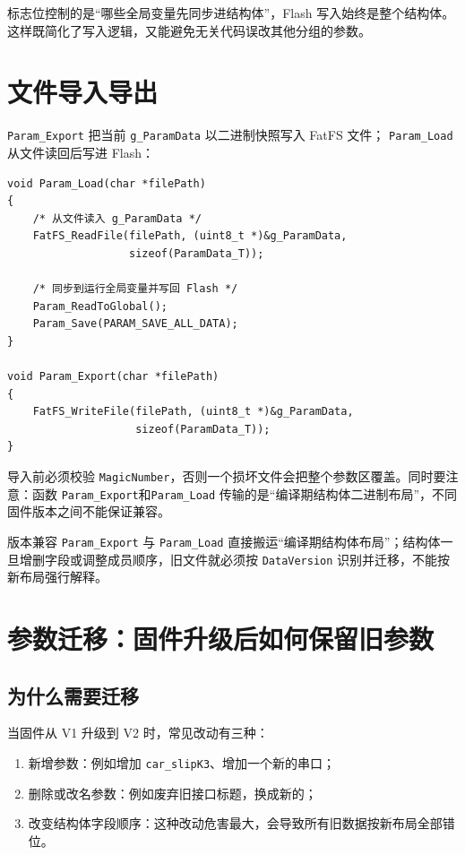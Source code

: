 标志位控制的是“哪些全局变量先同步进结构体”，Flash 写入始终是整个结构体。这样既简化了写入逻辑，又能避免无关代码误改其他分组的参数。

\section{文件导入导出}

\texttt{Param\_Export} 把当前 \texttt{g\_ParamData} 以二进制快照写入 FatFS 文件； \texttt{Param\_Load} 从文件读回后写进 Flash：

\begin{lstlisting}[style=c]
void Param_Load(char *filePath)
{
    /* 从文件读入 g_ParamData */
    FatFS_ReadFile(filePath, (uint8_t *)&g_ParamData,
                   sizeof(ParamData_T));

    /* 同步到运行全局变量并写回 Flash */
    Param_ReadToGlobal();
    Param_Save(PARAM_SAVE_ALL_DATA);
}

void Param_Export(char *filePath)
{
    FatFS_WriteFile(filePath, (uint8_t *)&g_ParamData,
                    sizeof(ParamData_T));
}
\end{lstlisting}

导入前必须校验 \texttt{MagicNumber}，否则一个损坏文件会把整个参数区覆盖。同时要注意：函数 \texttt{Param\_Export}和\texttt{Param\_Load} 传输的是“编译期结构体二进制布局”，不同固件版本之间不能保证兼容。

\begin{anybox}{版本兼容}
\texttt{Param\_Export} 与 \texttt{Param\_Load} 直接搬运“编译期结构体布局”；结构体一旦增删字段或调整成员顺序，旧文件就必须按 \texttt{DataVersion} 识别并迁移，不能按新布局强行解释。
\end{anybox}

\section{参数迁移：固件升级后如何保留旧参数}

\subsection{为什么需要迁移}

当固件从 V1 升级到 V2 时，常见改动有三种：

\begin{enumerate}
\item 新增参数：例如增加 \texttt{car\_slipK3}、增加一个新的串口；
\item 删除或改名参数：例如废弃旧接口标题，换成新的；
\item 改变结构体字段顺序：这种改动危害最大，会导致所有旧数据按新布局全部错位。
\end{enumerate}

